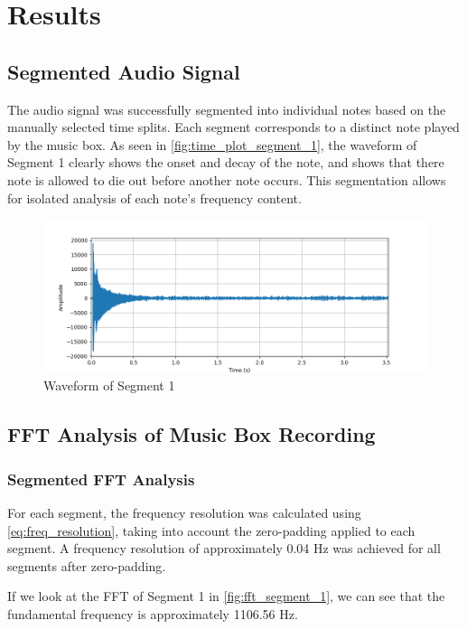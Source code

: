 \chapter{Results}

\section{Segmented Audio Signal}

The audio signal was successfully segmented into individual notes based on the manually selected time splits. Each segment corresponds to a distinct note played by the music box. As seen in \autoref{fig:time_plot_segment_1}, the waveform of Segment 1 clearly shows the onset and decay of the note, and shows that there note is allowed to die out before another note occurs. This segmentation allows for isolated analysis of each note's frequency content.

\begin{figure}[H]
    \centering
    \includegraphics[width=\textwidth]{data/time_plots/time_plot_segment_1.png}
    \caption{Waveform of Segment 1}
    \label{fig:time_plot_segment_1}
\end{figure}


\section{FFT Analysis of Music Box Recording}

\subsection{Segmented FFT Analysis}

For each segment, the frequency resolution was calculated using \autoref{eq:freq_resolution}, taking into account the zero-padding applied to each segment. A frequency resolution of approximately 0.04 Hz was achieved for all segments after zero-padding. 

If we look at the FFT of Segment 1 in \autoref{fig:fft_segment_1}, we can see that the fundamental frequency is approximately 1106.56 Hz. 

